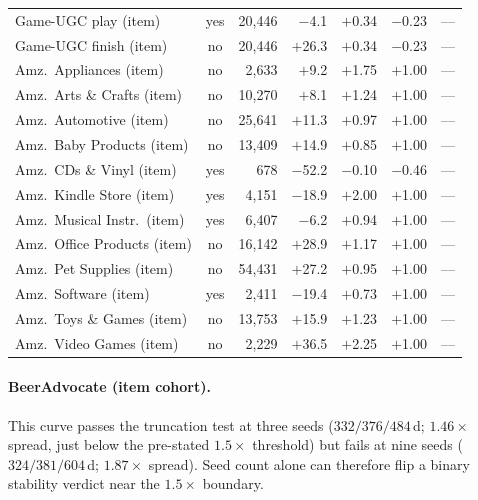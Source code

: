 \documentclass[10pt,letterpaper]{article}
\begin{document}
\begin{table}[t]
\begin{tabular}{lcrrrrr}
Game-UGC play (item)                          & yes &      20{,}446 &   $-$4.1 & $+$0.34 & $-$0.23 & --- \\
Game-UGC finish (item)                        & no  &      20{,}446 &  $+$26.3 & $+$0.34 & $-$0.23 & --- \\
Amz.\ Appliances (item)                       & no  &       2{,}633 &   $+$9.2 & $+$1.75 & $+$1.00 & --- \\
Amz.\ Arts \& Crafts (item)                   & no  &      10{,}270 &   $+$8.1 & $+$1.24 & $+$1.00 & --- \\
Amz.\ Automotive (item)                       & no  &      25{,}641 &  $+$11.3 & $+$0.97 & $+$1.00 & --- \\
Amz.\ Baby Products (item)                    & no  &      13{,}409 &  $+$14.9 & $+$0.85 & $+$1.00 & --- \\
Amz.\ CDs \& Vinyl (item)                     & yes &           678 &  $-$52.2 & $-$0.10 & $-$0.46 & --- \\
Amz.\ Kindle Store (item)                     & yes &       4{,}151 &  $-$18.9 & $+$2.00 & $+$1.00 & --- \\
Amz.\ Musical Instr.\ (item)                  & yes &       6{,}407 &   $-$6.2 & $+$0.94 & $+$1.00 & --- \\
Amz.\ Office Products (item)                  & no  &      16{,}142 &  $+$28.9 & $+$1.17 & $+$1.00 & --- \\
Amz.\ Pet Supplies (item)                     & no  &      54{,}431 &  $+$27.2 & $+$0.95 & $+$1.00 & --- \\
Amz.\ Software (item)                         & yes &       2{,}411 &  $-$19.4 & $+$0.73 & $+$1.00 & --- \\
Amz.\ Toys \& Games (item)                    & no  &      13{,}753 &  $+$15.9 & $+$1.23 & $+$1.00 & --- \\
Amz.\ Video Games (item)                      & no  &       2{,}229 &  $+$36.5 & $+$2.25 & $+$1.00 & --- \\
\bottomrule
\end{tabular}
\end{table}

\paragraph{BeerAdvocate (item cohort).}
This curve passes the truncation test at three seeds
($332 / 376 / 484$\,d; $1.46\times$ spread, just below the pre-stated
$1.5\times$ threshold) but fails at nine seeds ($324 / 381 / 604$\,d; $1.87\times$
spread). Seed count alone can therefore flip a binary stability verdict near
the $1.5\times$ boundary.
\end{document}
